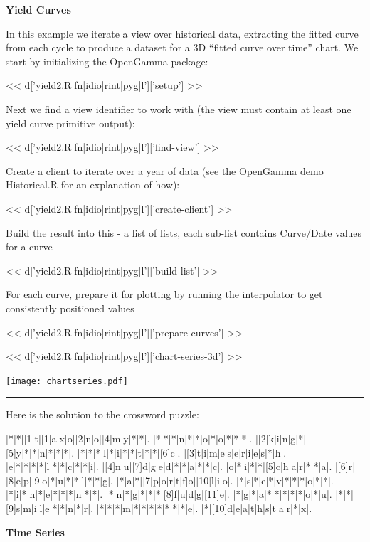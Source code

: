 \documentclass[custom, plainsections]{sciposter}
\begin{document}
\begin{multicols*}{2}

\textbf{Yield Curves}
\label{sec:yield-curves}

In this example we iterate a view over historical data, extracting the fitted curve from each cycle to produce a dataset for a 3D ``fitted curve over time'' chart. We start by initializing the OpenGamma package:

<< d['yield2.R|fn|idio|rint|pyg|l']['setup'] >>

Next we find a view identifier to work with (the view must contain at least one yield curve primitive output):

<< d['yield2.R|fn|idio|rint|pyg|l']['find-view'] >>

Create a client to iterate over a year of data (see the OpenGamma demo Historical.R for an explanation of how):

<< d['yield2.R|fn|idio|rint|pyg|l']['create-client'] >>

Build the result into this - a list of lists, each sub-list contains Curve/Date values for a curve

<< d['yield2.R|fn|idio|rint|pyg|l']['build-list'] >>

For each curve, prepare it for plotting by running the interpolator to get consistently positioned values

<< d['yield2.R|fn|idio|rint|pyg|l']['prepare-curves'] >>

<< d['yield2.R|fn|idio|rint|pyg|l']['chart-series-3d'] >>

\texttt{[image: chartseries.pdf]}

\hrule

Here is the solution to the crossword puzzle:

\PuzzleSolution
\begin{Puzzle}{12}{17}%
|*|*|[1]t|[1]a|x|o|[2]n|o|[4]m|y|*|*|.
|*|*|*|n|*|*|o|*|o|*|*|*|.
|[2]k|i|n|g|*|[5]y|*|*|n|*|*|*|.
|*|*|*|l|*|i|*|*|t|*|*|[6]c|.
|[3]t|i|m|e|s|e|r|i|e|s|*|h|.
|e|*|*|*|*|l|*|*|c|*|*|i|.
|[4]n|u|[7]d|g|e|d|*|*|a|*|*|c|.
|o|*|i|*|*|[5]c|h|a|r|*|*|a|.
|[6]r|[8]e|p|[9]o|*|u|*|*|l|*|*|g|.
|*|a|*|[7]p|o|r|t|f|o|[10]l|i|o|.
|*|s|*|e|*|v|*|*|*|o|*|*|.
|*|i|*|n|*|e|*|*|*|n|*|*|.
|*|n|*|g|*|*|*|[8]f|u|d|g|[11]e|.
|*|g|*|a|*|*|*|*|*|o|*|u|.
|*|*|[9]s|m|i|l|e|*|*|n|*|r|.
|*|*|*|m|*|*|*|*|*|*|*|e|.
|*|[10]d|e|a|t|h|s|t|a|r|*|x|.
\end{Puzzle}

\pagebreak

\textbf{Time Series}
\label{sec:time-series}


\end{multicols*}
\end{document}
